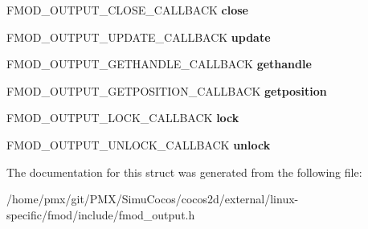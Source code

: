 \begin{DoxyCompactItemize}
\mbox{\label{structFMOD__OUTPUT__DESCRIPTION_a891b4be9f4dff65adf1ea95aad3a93e5}} 
F\+M\+O\+D\+\_\+\+O\+U\+T\+P\+U\+T\+\_\+\+C\+L\+O\+S\+E\+\_\+\+C\+A\+L\+L\+B\+A\+CK {\bfseries close}
\item 
\mbox{\label{structFMOD__OUTPUT__DESCRIPTION_a32b2ba46bc007fc8e07507b9f5b3ed4e}} 
F\+M\+O\+D\+\_\+\+O\+U\+T\+P\+U\+T\+\_\+\+U\+P\+D\+A\+T\+E\+\_\+\+C\+A\+L\+L\+B\+A\+CK {\bfseries update}
\item 
\mbox{\label{structFMOD__OUTPUT__DESCRIPTION_a9c601b0a736530c9352005b719b7d795}} 
F\+M\+O\+D\+\_\+\+O\+U\+T\+P\+U\+T\+\_\+\+G\+E\+T\+H\+A\+N\+D\+L\+E\+\_\+\+C\+A\+L\+L\+B\+A\+CK {\bfseries gethandle}
\item 
\mbox{\label{structFMOD__OUTPUT__DESCRIPTION_ae4977ffd6d2c31a700f186f396324ef1}} 
F\+M\+O\+D\+\_\+\+O\+U\+T\+P\+U\+T\+\_\+\+G\+E\+T\+P\+O\+S\+I\+T\+I\+O\+N\+\_\+\+C\+A\+L\+L\+B\+A\+CK {\bfseries getposition}
\item 
\mbox{\label{structFMOD__OUTPUT__DESCRIPTION_a01c26fcfb4c7d79ab40270f128c6d743}} 
F\+M\+O\+D\+\_\+\+O\+U\+T\+P\+U\+T\+\_\+\+L\+O\+C\+K\+\_\+\+C\+A\+L\+L\+B\+A\+CK {\bfseries lock}
\item 
\mbox{\label{structFMOD__OUTPUT__DESCRIPTION_ab91f638570b30e37560d58b9a8d493d5}} 
F\+M\+O\+D\+\_\+\+O\+U\+T\+P\+U\+T\+\_\+\+U\+N\+L\+O\+C\+K\+\_\+\+C\+A\+L\+L\+B\+A\+CK {\bfseries unlock}
\end{DoxyCompactItemize}


The documentation for this struct was generated from the following file\+:\begin{DoxyCompactItemize}
\item 
/home/pmx/git/\+P\+M\+X/\+Simu\+Cocos/cocos2d/external/linux-\/specific/fmod/include/fmod\+\_\+output.\+h\end{DoxyCompactItemize}
